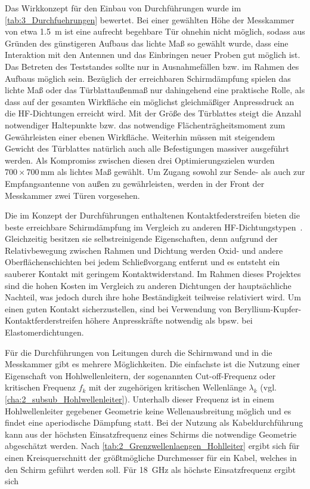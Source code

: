 \par
\vspace{\linespace} 
Das Wirkkonzept für den Einbau von Durchführungen wurde im \Abschnitt\ref{tab:3_Durchfuehrungen} bewertet. Bei einer gewählten Höhe der Messkammer von etwa \SI{1,5}{\meter} ist eine aufrecht begehbare Tür ohnehin nicht möglich, sodass aus Gründen des günstigeren Aufbaus das lichte Maß so gewählt wurde, dass eine Interaktion mit den Antennen und das Einbringen neuer Proben gut möglich ist. Das Betreten des Teststandes sollte nur in Ausnahmefällen bzw. im Rahmen des Aufbaus möglich sein. Bezüglich der erreichbaren Schirmdämpfung spielen das lichte Maß oder das Türblattaußenmaß nur dahingehend eine praktische Rolle, als dass auf der gesamten Wirkfläche ein möglichst gleichmäßiger Anpressdruck an die HF-Dichtungen erreicht wird. Mit der Größe des Türblattes steigt die Anzahl notwendiger Haltepunkte bzw. das notwendige Flächenträgheitsmoment zum Gewährleisten einer ebenen Wirkfläche. Weiterhin müssen mit steigendem Gewicht des Türblattes natürlich auch alle Befestigungen massiver ausgeführt werden. Als Kompromiss zwischen diesen drei Optimierungszielen wurden $700 \times 700\,\si{\milli\meter}$ als lichtes Maß gewählt. Um Zugang sowohl zur Sende- als auch zur Empfangsantenne von außen zu gewährleisten, werden in der Front der Messkammer zwei Türen vorgesehen.
\par
\vspace{\linespace}
Die im Konzept der Durchführungen enthaltenen Kontaktfederstreifen bieten die beste erreichbare Schirmdämpfung im Vergleich zu anderen HF-Dichtungstypen~\cite{EM_Schirmung}. Gleichzeitig besitzen sie selbstreinigende Eigenschaften, denn aufgrund der Relativbewegung zwischen Rahmen und Dichtung werden Oxid- und andere Oberflächenschichten bei jedem Schließvorgang entfernt und es entsteht ein sauberer Kontakt mit geringem Kontaktwiderstand. Im Rahmen dieses Projektes sind die hohen Kosten im Vergleich zu anderen Dichtungen der hauptsächliche Nachteil, was jedoch durch ihre hohe Beständigkeit teilweise relativiert wird. Um einen guten Kontakt sicherzustellen, sind bei Verwendung von Beryllium-Kupfer-Kontaktferderstreifen höhere Anpresskräfte notwendig als bpsw. bei Elastomerdichtungen.  
\par
\vspace{\linespace}
Für die Durchführungen von Leitungen durch die Schirmwand und in die Messkammer gibt es mehrere Möglichkeiten. Die einfachste ist die Nutzung einer Eigenschaft von Hohlwellenleitern, der sogenannten Cut-off-Frequenz oder kritischen Frequenz $f_k$ mit der zugehörigen kritischen Wellenlänge $\lambda_k$ (vgl. \Abschnitt\ref{cha:2_subsub_Hohlwellenleiter}). Unterhalb dieser Frequenz ist in einem Hohlwellenleiter gegebener Geometrie keine Wellenausbreitung möglich und es findet eine aperiodische Dämpfung statt. Bei der Nutzung als Kabeldurchführung kann aus der höchsten Einsatzfrequenz eines Schirms die notwendige Geometrie abgeschätzt werden. Nach \Tabelle\ref{tab:2_Grenzwellenlaengen_Hohlleiter} ergibt sich für einen Kreisquerschnitt der größtmögliche Durchmesser für ein Kabel, welches in den Schirm geführt werden soll. Für \SI{18}{\giga\hertz} als höchste Einsatzfrequenz ergibt sich

